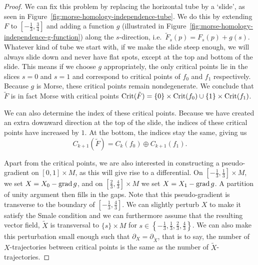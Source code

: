 \begin{proof}
We can fix this problem by replacing the horizontal tube by a `slide', as seen in Figure~\ref{fig:morse-homology-independence-tube}.
We do this by extending $F$ to $[-\frac{1}{3}, \frac{3}{4}]$ and adding a function $g$ (illustrated in Figure~\ref{fig:morse-homology-independence-g-function}) along the $s$-direction, i.e.\ $\tilde{F}_s(p) = F_s(p) + g(s)$.
Whatever kind of tube we start with, if we make the slide steep enough, we will always slide down and never have flat spots, except at the top and bottom of the slide.
This means if we choose $g$ appropriately, the only critical points lie in the slices $s=0$ and  $s=1$ and correspond to critical points of $f_0$ and $f_1$ respectively.
Because $g$ is Morse, these critical points remain nondegenerate.
We conclude that $\tilde{F}$ is in fact Morse with critical points $\operatorname{Crit}(\tilde{F}) = \{0\} \times \operatorname{Crit}(f_0) \cup \{1\} \times \operatorname{Crit}(f_1)$.

We can also determine the index of these critical points.
Because we have created an extra downward direction at the top of the slide, the indices of these critical points have increased by $1$.
At the bottom, the indices stay the same, giving us
\[
    C_{k+1}(\tilde{F}) = C_k(f_0) \oplus C_{k+1}(f_1)
.\] 

Apart from the critical points, we are also interested in constructing a pseudo-gradient on $[0,1]\times M$, as this will give rise to a differential.
 On $[-\frac{1}{3}, \frac{1}{3}] \times M$, we set $X = X_0 - \operatorname{grad} g$, and on $\left[\frac{2}{3}, \frac{4}{3}\right] \times M$ we set $X = X_1 - \operatorname{grad} g$.
A partition of unity argument then fills in the gaps.
Note that this pseudo-gradient is transverse to the boundary of $\left[-\frac{1}{3}, \frac{4}{3}\right]$.
We can slightly perturb $X$ to make it satisfy the Smale condition and we can furthermore assume that the resulting vector field, $\tilde{X}$ is transversal to $ \{s\} \times M$ for $s \in \left\{-\frac{1}{3}, \frac{1}{3}, \frac{2}{3}, \frac{4}{3}\right\}$.
We can also make this perturbation small enough such that $\partial_{X} = \partial_{\tilde{X}}$, that is to say, the number of $X$-trajectories between critical points is the same as the number of $\tilde{X}$-trajectories.


\end{proof}
